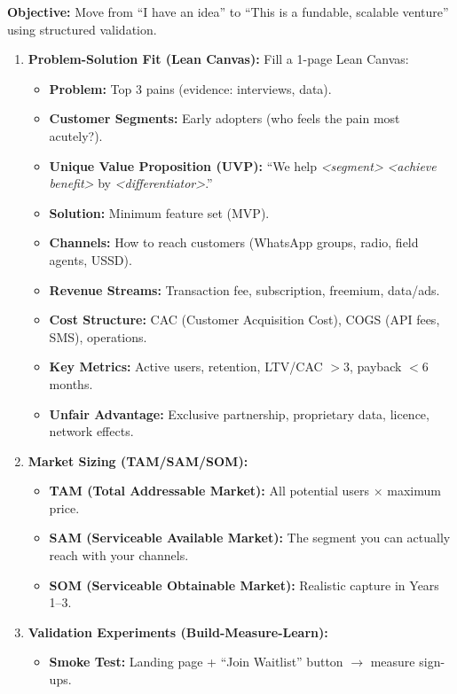 \documentclass[11pt]{article}
\begin{document}
\begin{methode}
\textbf{Objective:} Move from ``I have an idea'' to ``This is a fundable, scalable venture'' using structured validation.
\begin{enumerate}
    \item \textbf{Problem-Solution Fit (Lean Canvas):} Fill a 1-page Lean Canvas:
    \begin{itemize}
        \item \textbf{Problem:} Top 3 pains (evidence: interviews, data).
        \item \textbf{Customer Segments:} Early adopters (who feels the pain most acutely?).
        \item \textbf{Unique Value Proposition (UVP):} ``We help \emph{<segment>} \emph{<achieve benefit>} by \emph{<differentiator>}.''
        \item \textbf{Solution:} Minimum feature set (MVP).
        \item \textbf{Channels:} How to reach customers (WhatsApp groups, radio, field agents, USSD).
        \item \textbf{Revenue Streams:} Transaction fee, subscription, freemium, data/ads.
        \item \textbf{Cost Structure:} CAC (Customer Acquisition Cost), COGS (API fees, SMS), operations.
        \item \textbf{Key Metrics:} Active users, retention, LTV/CAC $> 3$, payback $< 6$ months.
        \item \textbf{Unfair Advantage:} Exclusive partnership, proprietary data, licence, network effects.
    \end{itemize}
    \item \textbf{Market Sizing (TAM/SAM/SOM):}
    \begin{itemize}
        \item \textbf{TAM (Total Addressable Market):} All potential users $\times$ maximum price.
        \item \textbf{SAM (Serviceable Available Market):} The segment you can actually reach with your channels.
        \item \textbf{SOM (Serviceable Obtainable Market):} Realistic capture in Years 1--3.
    \end{itemize}
    \item \textbf{Validation Experiments (Build-Measure-Learn):}
    \begin{itemize}
        \item \textbf{Smoke Test:} Landing page + ``Join Waitlist'' button $\to$ measure sign-ups.

\end{itemize}
\end{enumerate}
\end{methode}
\end{document}
